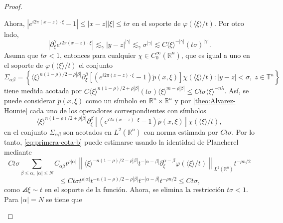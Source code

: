 \begin{proof}
\begin{itemize}
\begin{equation*}
		\end{equation*}
		Ahora, $|e^{i2\pi(x - z) \cdot \xi}-1| \leq |x-z||\xi|\leq t\sigma$ en el soporte de $\varphi(\langle\xi\rangle/t)$. Por otro lado, 
		\begin{equation*}
			|\partial^\gamma_\xi e^{i2\pi(x - z) \cdot \xi}| \lesssim_\gamma|y-z|^{|\gamma|} \lesssim_\gamma \sigma ^{|\gamma|} \lesssim C\langle\xi\rangle^{-|\gamma|}(t\sigma)^{|\gamma|}.
		\end{equation*}
		Asuma que $t\sigma < 1$, entonces para cualquier $\chi \in C_0^\infty(\mathbb{R}^n)$, que es igual a uno en el soporte de $\varphi(\langle\xi\rangle/t)$ el conjunto
		\begin{equation*}
			\Sigma_{\alpha\beta}=\left\{ \langle\xi\rangle^{n(1 - \rho)/2 + \rho|\beta|} \partial^\beta_\xi \left[\left( e^{i2\pi(x - z) \cdot \xi}-1 \right) 
			\tilde{p}(x, \xi) \right] \chi(\langle\xi\rangle/t) : |y-z| < \sigma,\; z \in \mathbb{T}^n \right\}
		\end{equation*}
		tiene medida acotada por $C\langle\xi\rangle^{n(1 - \rho)/2 + \rho|\beta|} (t\sigma)\langle\xi\rangle^{m-\rho |\beta|} \leq Ct\sigma \langle\xi\rangle^{-n\lambda} $. Así, se puede considerar $\tilde{p}(x, \xi)$ como un símbolo en $\mathbb{R}^n\times\mathbb{R}^n$ y por \cref{theo:Alvarez-Hounie} cada uno de los operadores correspondientes con símbolos $$\langle\xi\rangle^{n(1 - \rho)/2 + \rho|\beta|} \partial^\beta_\xi \left[\left( e^{i2\pi(x - z) \cdot \xi}-1 \right) 
		\tilde{p}(x, \xi) \right] \chi(\langle\xi\rangle/t),$$ en el conjunto $\Sigma_{\alpha\beta}$ son acotados en $L^2(\mathbb{R}^n)$ con norma estimada por $Ct\sigma$.
		Por lo tanto, \cref{eq:primera-cota-b} puede estimarse usando la identidad de Plancherel mediante 
		\begin{equation*}
			Ct\sigma\sum_{\beta\leq\alpha,\;|\alpha|\leq N} C_{\alpha\beta}t^{\rho|\alpha|}\left\|  
			\langle\xi\rangle^{-n(1-\rho)/2 - \rho|\beta|} t^{-|\alpha-\beta|} \partial^{\alpha-\beta}_\xi \varphi(\langle\xi\rangle/t) \right\|_{L^2(\mathbb{R}^n)}t^{-\rho n/2} 
		\end{equation*}
		\begin{equation}
			\leq Ct\sigma t^{\rho|\alpha|} t^{-n(1-\rho)/2 - \rho|\beta|}t^{-|\alpha-\beta|}t^{-\rho n/2} \leq Ct\sigma, 
			\label{eq:tsigma<1-b}
		\end{equation}
		como $\angles{\xi}\sim t$ en el soporte de la función. Ahora, se elimina la restricción $t\sigma < 1$. Para $|\alpha| = N$ se tiene que
		\begin{equation*}

\end{equation*}
\end{itemize}
\end{proof}
